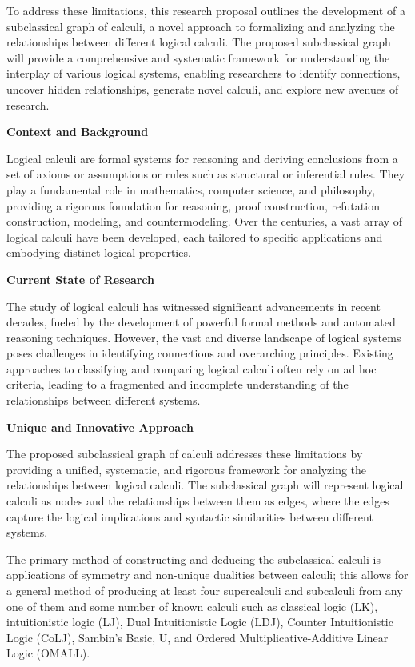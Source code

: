 To address these limitations, this research proposal outlines the
development of a subclassical graph of calculi, a novel approach to
formalizing and analyzing the relationships between different logical
calculi. The proposed subclassical graph will provide a comprehensive
and systematic framework for understanding the interplay of various
logical systems, enabling researchers to identify connections, uncover
hidden relationships, generate novel calculi, and explore new avenues of
research.

\textbf{Context and Background}

Logical calculi are formal systems for reasoning and deriving
conclusions from a set of axioms or assumptions or rules such as
structural or inferential rules. They play a fundamental role in
mathematics, computer science, and philosophy, providing a rigorous
foundation for reasoning, proof construction, refutation construction,
modeling, and countermodeling. Over the centuries, a vast array of
logical calculi have been developed, each tailored to specific
applications and embodying distinct logical properties.

\textbf{Current State of Research}

The study of logical calculi has witnessed significant advancements in
recent decades, fueled by the development of powerful formal methods and
automated reasoning techniques. However, the vast and diverse landscape
of logical systems poses challenges in identifying connections and
overarching principles. Existing approaches to classifying and comparing
logical calculi often rely on ad hoc criteria, leading to a fragmented
and incomplete understanding of the relationships between different
systems.

\textbf{Unique and Innovative Approach}

The proposed subclassical graph of calculi addresses these limitations
by providing a unified, systematic, and rigorous framework for analyzing
the relationships between logical calculi. The subclassical graph will
represent logical calculi as nodes and the relationships between them as
edges, where the edges capture the logical implications and syntactic
similarities between different systems.

The primary method of constructing and deducing the subclassical calculi
is applications of symmetry and non-unique dualities between calculi;
this allows for a general method of producing at least four supercalculi
and subcalculi from any one of them and some number of known calculi
such as classical logic (LK), intuitionistic logic (LJ), Dual
Intuitionistic Logic (LDJ), Counter Intuitionistic Logic (CoLJ),
Sambin's Basic, U, and Ordered Multiplicative-Additive Linear Logic
(OMALL).

